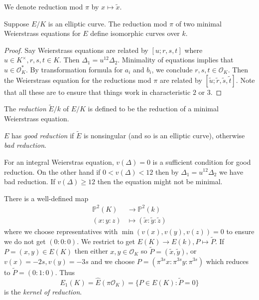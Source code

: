 \documentclass[a4paper]{article}
\theoremstyle{definition}
\renewcommand*{\P}{\mathbb{P}}
\renewcommand*{\O}{\mathcal{O}}
\begin{document}
\begin{notation}
  We denote reduction mod \(\pi\) by \(x \mapsto \tilde x\).
\end{notation}

\begin{proposition}
  Suppose \(E/K\) is an elliptic curve. The reduction mod \(\pi\) of two minimal Weierstrass equations for \(E\) define isomorphic curves over \(k\).
\end{proposition}

\begin{proof}
  Say Weierstrass equations are related by \([u; r, s, t]\) where \(u \in K^\times, r, s, t \in K\). Then \(\Delta_1 = u^{12} \Delta_2\). Minimality of equations implies that \(u \in \O_K^*\). By transformation formula for \(a_i\) and \(b_i\), we conclude \(r, s, t \in \O_K\). Then the Weierstrass equation for the reductions mod \(\pi\) are related by \([\tilde u; \tilde r, \tilde s, \tilde t]\). Note that all these are to ensure that things work in characteristic \(2\) or \(3\).
\end{proof}

\begin{definition}[reduction]
  The \emph{reduction} \(\widetilde E/k\) of \(E/K\) is defined to be the reduction of a minimal Weierstrass equation.

  \(E\) has \emph{good reduction} if \(\widetilde E\) is nonsingular (and so is an elliptic curve), otherwise \emph{bad reduction}.
\end{definition}

For an integral Weierstras equation, \(v(\Delta) = 0\) is a sufficient condition for good reduction. On the other hand if \(0 < v(\Delta) < 12\) then by \(\Delta_1 = u^{12} \Delta_2\) we have bad reduction. If \(v(\Delta) \geq 12\) then the equation might not be minimal.

There is a well-defined map
\begin{align*}
  \P^2(K) &\to \P^2(k) \\
  (x:y:z) &\mapsto (\tilde x: \tilde y: \tilde z)
\end{align*}
where we choose representatives with \(\min(v(x), v(y), v(z)) = 0\) to ensure we do not get \((0: 0: 0)\). We restrict to get \(E(K) \to E(k), P \mapsto \widetilde P\). If \(P = (x, y) \in E(K)\) then either \(x, y \in \O_K\) so \(\widetilde P = (\tilde x, \tilde y)\), or \(v(x) = -2s, v(y) = -3s\) and we choose \(P = (\pi^{3s} x: \pi^{3s}y: \pi^{3s})\) which reduces to \(\widetilde P = (0: 1: 0)\). Thus
\[
  E_1(K) = \hat E(\pi \O_K) = \{P \in E(K): \widetilde P = 0\}
\]
is the \emph{kernel of reduction}.
\end{document}
